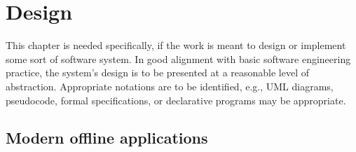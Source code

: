 \chapter{Design}
\label{Design}

This chapter is needed specifically, if the work is meant to design or implement some sort of software system. In good alignment with basic software engineering practice, the system's design is to be presented at a reasonable level of abstraction. Appropriate notations are to be identified, e.g., UML diagrams, pseudocode, formal specifications, or declarative programs may be appropriate.


\section{Modern offline applications}

